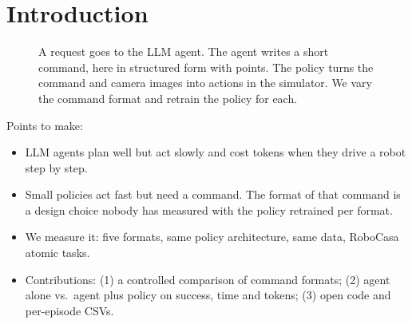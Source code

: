 \section{Introduction}
\label{sec:intro}


\begin{figure}[t]
  \centering
  \resizebox{\textwidth}{!}{}
  \caption{ A request goes to the LLM agent. The agent
  writes a short command, here in structured form with points. The policy
  turns the command and camera images into actions in the simulator. We vary
  the command format and retrain the policy for each.}
  \label{fig:overview}
\end{figure}

Points to make:
\begin{itemize}
  \item LLM agents plan well but act slowly and cost tokens when they drive a robot step by step.
  \item Small policies act fast but need a command. The format of that command is a design choice nobody has measured with the policy retrained per format.
  \item We measure it: five formats, same policy architecture, same data, RoboCasa atomic tasks.
  \item Contributions: (1) a controlled comparison of command formats; (2) agent alone vs.\ agent plus policy on success, time and tokens; (3) open code and per-episode CSVs.
\end{itemize}
